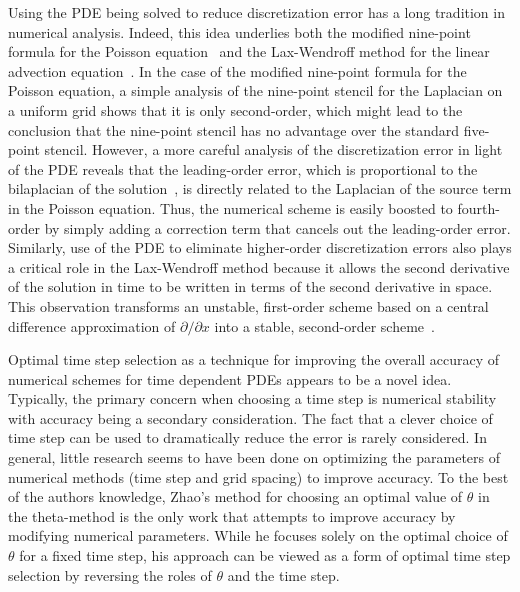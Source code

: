 \documentclass[oneeqnum,onefignum,onetabnum,onethmnum]{siamltex}
\begin{document}
Using the PDE being solved to reduce discretization error has a long 
tradition in numerical analysis.  Indeed, this idea underlies both the 
modified nine-point formula for the Poisson equation~\cite{iserles_book} and 
the Lax-Wendroff method for the linear advection 
equation~\cite{leveque_book_1992, leveque_book_2002, gko_book}.  
In the case of the modified nine-point formula for the Poisson equation, a 
simple analysis of the nine-point stencil for the Laplacian on a uniform grid 
shows that it is only second-order, which might lead to the conclusion that 
the nine-point stencil has no advantage over the standard five-point stencil.  
However, a more careful analysis of the discretization error in light of the 
PDE reveals that the leading-order error, which is proportional to the 
bilaplacian of the solution~\cite{iserles_book, patra_2005}, is directly 
related to the Laplacian of the source term in the Poisson equation.  Thus, 
the numerical scheme is easily boosted to fourth-order by simply adding a 
correction term that cancels out the leading-order error.   
Similarly, use of the PDE to eliminate higher-order discretization errors also 
plays a critical role in the Lax-Wendroff method because it allows the second 
derivative of the solution in time to be written in terms of the second 
derivative in space.  This observation transforms an unstable, first-order 
scheme based on a central difference approximation of 
$\partial/\partial x$ into a stable, second-order 
scheme~\cite{leveque_book_1992, leveque_book_2002}.

Optimal time step selection as a technique for improving the overall accuracy 
of numerical schemes for time dependent PDEs appears to be a novel idea.
Typically, the primary concern when choosing a time step is numerical 
stability with accuracy being a secondary consideration.  The fact that a 
clever choice of time step can be used to dramatically reduce the error is 
rarely considered.  In general, little research seems to have been done on 
optimizing the parameters of numerical methods (\eg time step and grid 
spacing) to improve accuracy.  To the best of the authors knowledge, Zhao's 
method for choosing an optimal value of $\theta$ in the theta-method is the 
only work that attempts to improve accuracy by modifying numerical parameters.
While he focuses solely on the optimal choice of $\theta$ for a fixed time 
step, his approach can be viewed as a form of optimal time step selection by 
reversing the roles of $\theta$ and the time step.  
\end{document}

